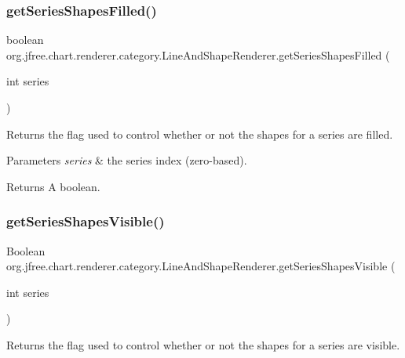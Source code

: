 \subsubsection{\texorpdfstring{get\+Series\+Shapes\+Filled()}{getSeriesShapesFilled()}}
{\footnotesize\ttfamily boolean org.\+jfree.\+chart.\+renderer.\+category.\+Line\+And\+Shape\+Renderer.\+get\+Series\+Shapes\+Filled (\begin{DoxyParamCaption}\item[{int}]{series }\end{DoxyParamCaption})}

Returns the flag used to control whether or not the shapes for a series are filled.


\begin{DoxyParams}{Parameters}
{\em series} & the series index (zero-\/based).\\
\hline
\end{DoxyParams}
\begin{DoxyReturn}{Returns}
A boolean. 
\end{DoxyReturn}
\mbox{\label{classorg_1_1jfree_1_1chart_1_1renderer_1_1category_1_1_line_and_shape_renderer_af607c5d82294d4f53fb28935994c715d}} 
\subsubsection{\texorpdfstring{get\+Series\+Shapes\+Visible()}{getSeriesShapesVisible()}}
{\footnotesize\ttfamily Boolean org.\+jfree.\+chart.\+renderer.\+category.\+Line\+And\+Shape\+Renderer.\+get\+Series\+Shapes\+Visible (\begin{DoxyParamCaption}\item[{int}]{series }\end{DoxyParamCaption})}

Returns the flag used to control whether or not the shapes for a series are visible.


